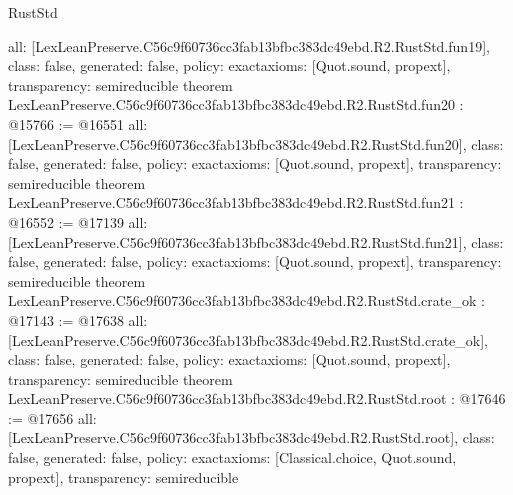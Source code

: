 \begin{lexlean}{RustStd}
\begin{coremodule}
{  all: [LexLeanPreserve.C56c9f60736cc3fab13bfbc383dc49ebd.R2.RustStd.fun19],
  class: false,
  generated: false,
  policy: exact{axioms: [Quot.sound, propext]},
  transparency: semireducible
}
theorem LexLeanPreserve.C56c9f60736cc3fab13bfbc383dc49ebd.R2.RustStd.fun20 : @15766 := @16551 {
  all: [LexLeanPreserve.C56c9f60736cc3fab13bfbc383dc49ebd.R2.RustStd.fun20],
  class: false,
  generated: false,
  policy: exact{axioms: [Quot.sound, propext]},
  transparency: semireducible
}
theorem LexLeanPreserve.C56c9f60736cc3fab13bfbc383dc49ebd.R2.RustStd.fun21 : @16552 := @17139 {
  all: [LexLeanPreserve.C56c9f60736cc3fab13bfbc383dc49ebd.R2.RustStd.fun21],
  class: false,
  generated: false,
  policy: exact{axioms: [Quot.sound, propext]},
  transparency: semireducible
}
theorem LexLeanPreserve.C56c9f60736cc3fab13bfbc383dc49ebd.R2.RustStd.crate_ok : @17143 := @17638 {
  all: [LexLeanPreserve.C56c9f60736cc3fab13bfbc383dc49ebd.R2.RustStd.crate_ok],
  class: false,
  generated: false,
  policy: exact{axioms: [Quot.sound, propext]},
  transparency: semireducible
}
theorem LexLeanPreserve.C56c9f60736cc3fab13bfbc383dc49ebd.R2.RustStd.root : @17646 := @17656 {
  all: [LexLeanPreserve.C56c9f60736cc3fab13bfbc383dc49ebd.R2.RustStd.root],
  class: false,
  generated: false,
  policy: exact{axioms: [Classical.choice, Quot.sound, propext]},
  transparency: semireducible
}


\end{coremodule}
\end{lexlean}
